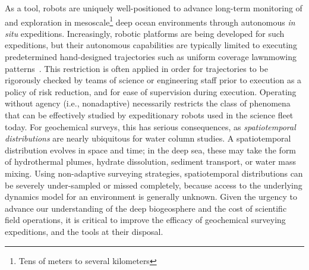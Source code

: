 As a tool, robots are uniquely well-positioned to advance long-term monitoring of and exploration in mesoscale\footnote{Tens of meters to several kilometers} deep ocean environments through autonomous \emph{in situ} expeditions. 
Increasingly, robotic platforms are being developed for such expeditions, but their autonomous capabilities are typically limited to executing predetermined hand-designed trajectories such as uniform coverage lawnmowing patterns~\autocite{camilli2010tracking}.
This restriction is often applied in order for trajectories to be rigorously checked by teams of science or engineering staff prior to execution as a policy of risk reduction, and for ease of supervision during execution.
Operating without agency (i.e., nonadaptive) necessarily restricts the class of phenomena that can be effectively studied by expeditionary robots used in the science fleet today.
For geochemical surveys, this has serious consequences, as \emph{spatiotemporal distributions} are nearly ubiquitous for water column studies.
A spatiotemporal distribution evolves in space and time; in the deep sea, these may take the form of hydrothermal plumes, hydrate dissolution, sediment transport, or water mass mixing. 
Using non-adaptive surveying strategies, spatiotemporal distributions can be severely under-sampled or missed completely\autocite{flaspohler2019information, preston2019adaptive}, because access to the underlying dynamics model for an environment is generally unknown.
Given the urgency to advance our understanding of the deep biogeosphere and the cost of scientific field operations, it is critical to improve the efficacy of geochemical surveying expeditions, and the tools at their disposal.

